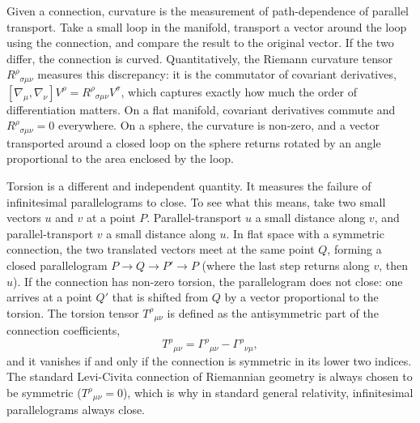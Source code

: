 \documentclass[%
 reprint,
 amsmath,amssymb,
 aps,
 prb,
]{revtex4-2}
\numberwithin{equation}{section}
\begin{document}
Given a connection, curvature is the measurement of path-dependence of parallel transport. Take a small loop in the manifold, transport a vector around the loop using the connection, and compare the result to the original vector. If the two differ, the connection is curved. Quantitatively, the Riemann curvature tensor $R^\rho{}_{\sigma\mu\nu}$ measures this discrepancy: it is the commutator of covariant derivatives, $[\nabla_\mu, \nabla_\nu] V^\rho = R^\rho{}_{\sigma\mu\nu} V^\sigma$, which captures exactly how much the order of differentiation matters. On a flat manifold, covariant derivatives commute and $R^\rho{}_{\sigma\mu\nu} = 0$ everywhere. On a sphere, the curvature is non-zero, and a vector transported around a closed loop on the sphere returns rotated by an angle proportional to the area enclosed by the loop.

Torsion is a different and independent quantity. It measures the failure of infinitesimal parallelograms to close. To see what this means, take two small vectors $u$ and $v$ at a point $P$. Parallel-transport $u$ a small distance along $v$, and parallel-transport $v$ a small distance along $u$. In flat space with a symmetric connection, the two translated vectors meet at the same point $Q$, forming a closed parallelogram $P \to Q \to P' \to P$ (where the last step returns along $v$, then $u$). If the connection has non-zero torsion, the parallelogram does not close: one arrives at a point $Q'$ that is shifted from $Q$ by a vector proportional to the torsion. The torsion tensor $T^\rho{}_{\mu\nu}$ is defined as the antisymmetric part of the connection coefficients,
\begin{equation}
T^\rho{}_{\mu\nu} = \Gamma^\rho{}_{\mu\nu} - \Gamma^\rho{}_{\nu\mu},
\label{eq:torsion_def}
\end{equation}
and it vanishes if and only if the connection is symmetric in its lower two indices. The standard Levi-Civita connection of Riemannian geometry is always chosen to be symmetric ($T^\rho{}_{\mu\nu} = 0$), which is why in standard general relativity, infinitesimal parallelograms always close.
\end{document}
